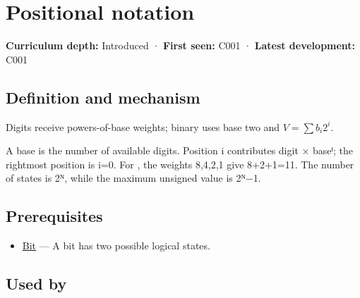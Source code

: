 \hypertarget{appendix-83c3f28f7bda}{}\label{referencestart:appendix-83c3f28f7bda}
\section{Positional notation}\label{appendix-83c3f28f7bda-positional-notation}

\hypertarget{appendix-83c3f28f7bda-positional-notation}{}

\textbf{Curriculum depth:} Introduced · \textbf{First seen:} C001 · \textbf{Latest development:} C001

\begin{allmightroledefinition}

\subsection{Definition and mechanism}\label{appendix-83c3f28f7bda-definition-and-mechanism}

\hypertarget{appendix-83c3f28f7bda-definition-and-mechanism}{}

Digits receive powers-of-base weights; binary uses base two and \(V=\sum b_i2^i\).

\end{allmightroledefinition}

A base is the number of available digits. Position i contributes digit × baseⁱ; the rightmost position is i=0. For , the weights 8,4,2,1 give 8+2+1=11. The number of states is 2ᴺ, while the maximum unsigned value is 2ᴺ−1.

\subsection{Prerequisites}\label{appendix-83c3f28f7bda-prerequisites}

\hypertarget{appendix-83c3f28f7bda-prerequisites}{}

\begin{itemize}
\tightlist
\item
  \hyperref[appendix-ddbb69998a2e]{Bit} --- A bit has two possible logical states.
\end{itemize}

\subsection{Used by}\label{appendix-83c3f28f7bda-used-by}

\hypertarget{appendix-83c3f28f7bda-used-by}{}

